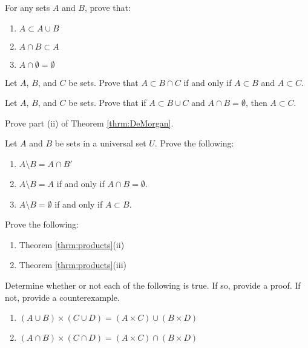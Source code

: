 \begin{exercise}\label{sets:containment}
For any sets $A$ and $B$, prove that:
\begin{enumerate}
\item\label{containment:un}\markit $A\subset A\cup B$
\item $A\cap B\subset A$
\item $A\cap\emptyset=\emptyset$
\end{enumerate}
\end{exercise}

\begin{exercise}\label{sets:intersections}
Let $A$, $B$, and $C$ be sets.  Prove that $A\subset B\cap C$ if and
only if $A\subset B$ and $A\subset C$.
\end{exercise}

\begin{exercise}
Let $A$, $B$, and $C$ be sets.  Prove that if $A\subset B\cup C$ and
$A\cap B=\emptyset$, then $A\subset C$.
\end{exercise}

\begin{exercise}
Prove part (ii) of Theorem \ref{thrm:DeMorgan}.
\end{exercise}

\begin{exercise}
Let $A$ and $B$ be sets in a universal set $U$.  Prove the following:
\begin{enumerate}
\item $A\setminus B=A\cap B'$
\item $A\setminus B=A$ if and only if $A\cap B=\emptyset$.
\item $A\setminus B=\emptyset$ if and only if $A\subset B$.
\end{enumerate}
\end{exercise}

\begin{exercise} Prove the following:
\begin{enumerate}
\item Theorem \ref{thrm:products}(ii)
\item Theorem \ref{thrm:products}(iii)
\end{enumerate}
\end{exercise}

\begin{exercise}
Determine whether or not each of the following is true.  If so, provide
a proof.  If not, provide a counterexample.
\begin{enumerate}
\item $(A\cup B)\times(C\cup D)=(A\times C)\cup(B\times D)$
\item $(A\cap B)\times(C\cap D)=(A\times C)\cap(B\times D)$
\end{enumerate}
\end{exercise}

